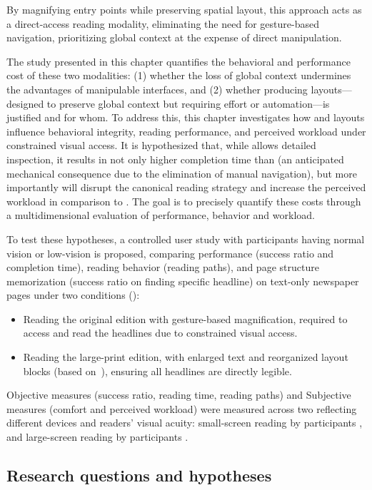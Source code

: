 By magnifying entry points while preserving spatial layout, this approach acts as a direct-access reading modality,  eliminating the need for gesture-based navigation, prioritizing global context at the expense of direct manipulation.

The study presented in this chapter quantifies the behavioral and performance cost of these two modalities:  (1) whether the loss of global context undermines the advantages of manipulable interfaces, and (2) whether producing \condtwo layouts---designed to preserve global context but requiring effort or automation---is justified and for whom. To address this, this chapter investigates how \condone and \condtwo layouts influence behavioral integrity, reading performance, and perceived workload under constrained visual access. It is hypothesized that, while \panzoom allows detailed inspection, it results in not only higher completion time than \condtwo (an anticipated mechanical consequence due to the elimination of manual navigation), but more importantly will disrupt the canonical reading strategy and increase the perceived workload in comparison to \condtwo. The goal is to precisely quantify these costs through a multidimensional evaluation of performance, behavior and workload.

To test these hypotheses,  a controlled user study with participants having normal vision or low-vision is proposed, comparing performance (success ratio and completion time), reading behavior (reading paths), and page structure memorization (success ratio on finding specific headline) on text-only newspaper pages under two conditions ():
\begin{itemize}
    \item [(\condonenot)] Reading the original edition with gesture-based magnification, required to access and read the headlines due to constrained visual access.
    \item [(\condtwonot)] Reading the large-print edition, with enlarged text and reorganized layout blocks (based on~), ensuring all headlines are directly legible.
\end{itemize}
Objective measures (success ratio, reading time, reading paths) and Subjective measures (comfort and perceived workload) were measured across two \CVAS reflecting different devices and readers' visual acuity: small-screen reading by participants \NV, and large-screen reading by participants \LV.


\subsection{Research questions and hypotheses}
\label{sec:magnification-rq}


